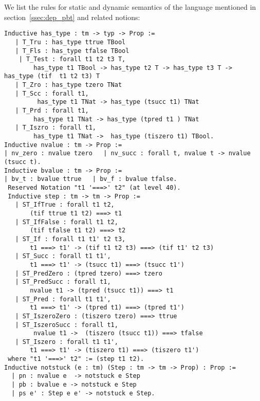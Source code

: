 We list the rules for static and dynamic semantics of the language mentioned in section~\ref{ssec:dep_pbt} and related notions:
\begin{lstlisting}
Inductive has_type : tm -> typ -> Prop :=
   | T_Tru : has_type ttrue TBool
   | T_Fls : has_type tfalse TBool
    | T_Test : forall t1 t2 t3 T,
        has_type t1 TBool -> has_type t2 T -> has_type t3 T ->  has_type (tif  t1 t2 t3) T 
   | T_Zro : has_type tzero TNat
   | T_Scc : forall t1,
         has_type t1 TNat -> has_type (tsucc t1) TNat
   | T_Prd : forall t1,
        has_type t1 TNat -> has_type (tpred t1 ) TNat
   | T_Iszro : forall t1,
        has_type t1 TNat ->  has_type (tiszero t1) TBool.
Inductive nvalue : tm -> Prop :=
| nv_zero : nvalue tzero   | nv_succ : forall t, nvalue t -> nvalue (tsucc t).
Inductive bvalue : tm -> Prop :=
| bv_t : bvalue ttrue   | bv_f : bvalue tfalse. 
 Reserved Notation "t1 '===>' t2" (at level 40).
 Inductive step : tm -> tm -> Prop :=
   | ST_IfTrue : forall t1 t2,
       (tif ttrue t1 t2) ===> t1
   | ST_IfFalse : forall t1 t2,
       (tif tfalse t1 t2) ===> t2
   | ST_If : forall t1 t1' t2 t3,
       t1 ===> t1' -> (tif t1 t2 t3) ===> (tif t1' t2 t3)
   | ST_Succ : forall t1 t1',
       t1 ===> t1' -> (tsucc t1) ===> (tsucc t1')
   | ST_PredZero : (tpred tzero) ===> tzero
   | ST_PredSucc : forall t1,
       nvalue t1 -> (tpred (tsucc t1)) ===> t1
   | ST_Pred : forall t1 t1',
       t1 ===> t1' -> (tpred t1) ===> (tpred t1')
   | ST_IszeroZero : (tiszero tzero) ===> ttrue
   | ST_IszeroSucc : forall t1,
        nvalue t1 ->  (tiszero (tsucc t1)) ===> tfalse
   | ST_Iszero : forall t1 t1',
       t1 ===> t1' -> (tiszero t1) ===> (tiszero t1')
 where "t1 '===>' t2" := (step t1 t2).
Inductive notstuck (e : tm) (Step : tm -> tm -> Prop) : Prop :=
  | pn : nvalue e  -> notstuck e Step
  | pb : bvalue e -> notstuck e Step
  | ps e' : Step e e' -> notstuck e Step.
\end{lstlisting}

